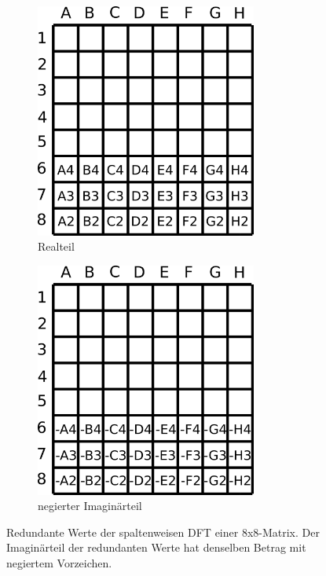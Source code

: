 \begin{figure}[htbp]
 \centering
  \begin{subfigure}{.5\textwidth}
  \centering
   \includegraphics[width=0.8\textwidth]{img/reelleMatMultRedundanzRealteil.png}
   \caption{Realteil}
  \end{subfigure}%
  \begin{subfigure}{.5\textwidth} 
   \centering
   \includegraphics[width=0.8\textwidth]{img/reelleMatMultRedundanzImagteil.png}
   \caption{negierter Imaginärteil}
  \end{subfigure}
  \caption{Redundante Werte der spaltenweisen DFT einer 8x8-Matrix. Der Imaginärteil der redundanten Werte hat denselben Betrag mit negiertem Vorzeichen.}
 \label{pic:reelleMatMultRedundanz}
\end{figure}





